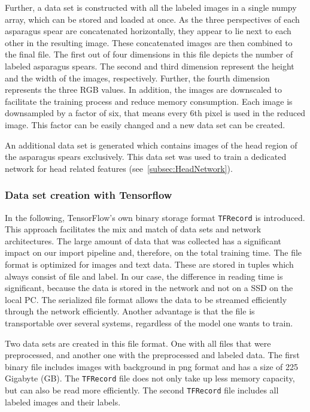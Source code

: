 Further, a data set is constructed with all the labeled images in a single numpy array, which can be stored and loaded at once. As the three perspectives of each asparagus spear are concatenated horizontally, they appear to lie next to each other in the resulting image. These concatenated images are then combined to the final file. The first out of four dimensions in this file depicts the number of labeled asparagus spears. The second and third dimension represent the height and the width of the images, respectively. Further, the fourth dimension represents the three RGB values.
In addition, the images are downscaled to facilitate the training process and reduce memory consumption. Each image is downsampled by a factor of six, that means every 6th pixel is used in the reduced image. This factor can be easily changed and a new data set can be created. 

An additional data set is generated which contains images of the head region of the asparagus spears exclusively. This data set was used to train a dedicated network for head related features (see~\autoref{subsec:HeadNetwork}).


\subsubsection{Data set creation with Tensorflow}
\label{subsec:DataSetTheory}


In the following, TensorFlow's own binary storage format \texttt{TFRecord} is introduced. This approach facilitates the mix and match of data sets and network architectures. The large amount of data that was collected has a significant impact on our import pipeline and, therefore, on the total training time. The file format is optimized for images and text data. These are stored in tuples which always consist of file and label. In our case, the difference in reading time is significant, because the data is stored in the network and not on a SSD on the local PC. The serialized file format allows the data to be streamed efficiently through the network efficiently. Another advantage is that the file is transportable over several systems, regardless of the model one wants to train.

Two data sets are created in this file format. One with all files that were preprocessed, and another one with the preprocessed and labeled data.
The first binary file includes images with background in png format and has a size of 225 Gigabyte (GB). The \texttt{TFRecord} file does not only take up less memory capacity, but can also be read more efficiently. The second \texttt{TFRecord} file includes all labeled images and their labels.

